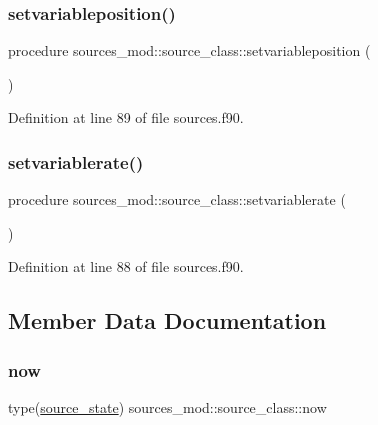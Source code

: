 \subsubsection{\texorpdfstring{setvariableposition()}{setvariableposition()}}
{\footnotesize\ttfamily procedure sources\+\_\+mod\+::source\+\_\+class\+::setvariableposition (\begin{DoxyParamCaption}{ }\end{DoxyParamCaption})\hspace{0.3cm}{\ttfamily [private]}}



Definition at line 89 of file sources.\+f90.

\mbox{\label{structsources__mod_1_1source__class_ac417ca6bfe88767ed46df5ac9cbddb5e}} 
\subsubsection{\texorpdfstring{setvariablerate()}{setvariablerate()}}
{\footnotesize\ttfamily procedure sources\+\_\+mod\+::source\+\_\+class\+::setvariablerate (\begin{DoxyParamCaption}{ }\end{DoxyParamCaption})\hspace{0.3cm}{\ttfamily [private]}}



Definition at line 88 of file sources.\+f90.



\subsection{Member Data Documentation}
\mbox{\label{structsources__mod_1_1source__class_aa79ef3a745f7e6e934acdda367e8995c}} 
\subsubsection{\texorpdfstring{now}{now}}
{\footnotesize\ttfamily type(\mbox{\hyperlink{structsources__mod_1_1source__state}{source\+\_\+state}}) sources\+\_\+mod\+::source\+\_\+class\+::now\hspace{0.3cm}{\ttfamily [private]}}



